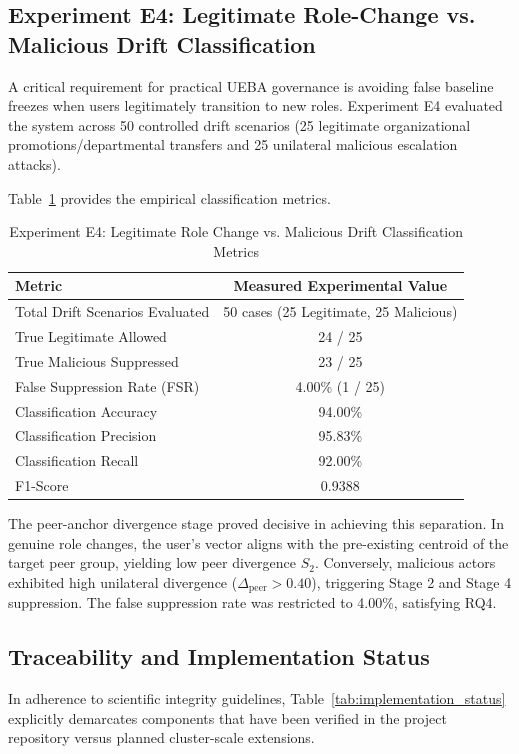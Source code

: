 \documentclass[conference]{IEEEtran}
\begin{document}
\subsection{Experiment E4: Legitimate Role-Change vs. Malicious Drift Classification}
\label{subsec:e4}
A critical requirement for practical UEBA governance is avoiding false baseline freezes when users legitimately transition to new roles. Experiment E4 evaluated the system across 50 controlled drift scenarios (25 legitimate organizational promotions/departmental transfers and 25 unilateral malicious escalation attacks). 

Table~\ref{tab:e4_results} provides the empirical classification metrics.

\begin{table}[htbp]
\caption{Experiment E4: Legitimate Role Change vs. Malicious Drift Classification Metrics}
\label{tab:e4_results}
\centering
\begin{tabular}{lc}
\toprule
\textbf{Metric} & \textbf{Measured Experimental Value} \\
\midrule
Total Drift Scenarios Evaluated & 50 cases (25 Legitimate, 25 Malicious) \\
True Legitimate Allowed & 24 / 25 \\
True Malicious Suppressed & 23 / 25 \\
False Suppression Rate (FSR) & 4.00\% (1 / 25) \\
Classification Accuracy & 94.00\% \\
Classification Precision & 95.83\% \\
Classification Recall & 92.00\% \\
F1-Score & 0.9388 \\
\bottomrule
\end{tabular}
\end{table}

The peer-anchor divergence stage proved decisive in achieving this separation. In genuine role changes, the user's vector aligns with the pre-existing centroid of the target peer group, yielding low peer divergence $S_2$. Conversely, malicious actors exhibited high unilateral divergence ($\Delta_{\text{peer}} > 0.40$), triggering Stage 2 and Stage 4 suppression. The false suppression rate was restricted to 4.00\%, satisfying RQ4.

\subsection{Traceability and Implementation Status}
\label{subsec:traceability}
In adherence to scientific integrity guidelines, Table~\ref{tab:implementation_status} explicitly demarcates components that have been verified in the project repository versus planned cluster-scale extensions.
\end{document}
